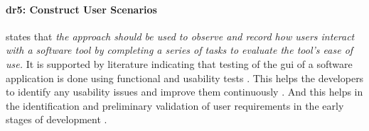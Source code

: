 
\paragraph{\ac{dr}5: Construct User Scenarios} states that \textit{the approach should be used to observe and record how users interact with a software tool by completing a series of tasks to evaluate the tool's ease of use.} 
It is supported by literature indicating that testing of the \ac{gui} of a software application is done using functional and usability tests \cite{misc:usability:tasks}. 
This helps the developers to identify any usability issues \cite{article:tbup:kari} and improve them continuously \cite{article:prototyping:gould}.
And this helps in the identification and preliminary validation of user requirements in the early stages of development \cite{article:prototyping:weichbroth}. 


